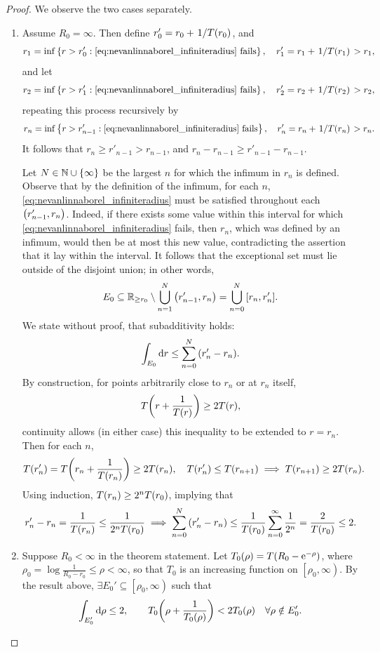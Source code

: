 \begin{proof}
    We observe the two cases separately.
    \begin{enumerate}
        \item Assume \(R_0=\infty\). Then define \(r'_0=r_0+\flatfrac1{T\qty(r_0)}\), and \[r_1=\inf\cbraces{r>r'_0}{\text{\cref{eq:nevanlinnaborel_infiniteradius} fails}},\quad r'_1=r_1+\flatfrac1{T\qty(r_1)}>r_1,\]
            and let \[r_2=\inf\cbraces{r>r'_1}{\text{\cref{eq:nevanlinnaborel_infiniteradius} fails}},\quad r'_2=r_2+\flatfrac1{T\qty(r_2)}>r_2,\] repeating this process recursively by \[r_n=\inf\cbraces{r>r'_{n-1}}{\text{\cref{eq:nevanlinnaborel_infiniteradius} fails}},\quad r'_n=r_n+\flatfrac1{T\qty(r_n)}>r_n.\] It follows that \(r_n\geq r'_{n-1}>r_{n-1}\), and \(r_n-r_{n-1}\geq r'_{n-1}-r_{n-1}\).

            Let \(N\in\mathbb{N}\cup\qty{\infty}\) be the largest \(n\) for which the infimum in \(r_n\) is defined. Observe that by the definition of the infimum, for each \(n\), \cref{eq:nevanlinnaborel_infiniteradius} must be satisfied throughout each \(\qty(r'_{n-1},r_n)\). Indeed, if there exists some value within this interval for which \cref{eq:nevanlinnaborel_infiniteradius} fails, then \(r_n\), which was defined by an infimum, would then be at most this new value, contradicting the assertion that it lay within the interval. It follows that the exceptional set must lie outside of the disjoint union; in other words, \[E_0\subseteq\mathbb{R}_{\geq r_0}\setminus\bigcup_{n=1}^N\qty(r'_{n-1},r_n)=\bigcup_{n=0}^N\qty[r_n,r'_n].\]
            We state without proof, that subadditivity holds:
            \[\int_{E_0}\dd{r}\leq\sum_{n=0}^N\qty(r'_n-r_n).\]
            By construction, for points arbitrarily close to \(r_n\) or at \(r_n\) itself, \[T\qty(r+\frac1{T(r)})\geq 2T(r),\]
            continuity allows (in either case) this inequality to be extended to \(r=r_n\). Then for each \(n\), \[T\qty(r'_n)=T\qty(r_n+\frac1{T\qty(r_n)})\geq 2T\qty(r_n),\quad T\qty(r'_n)\leq T\qty(r_{n+1})\implies T\qty(r_{n+1})\geq 2T\qty(r_n).\]
            Using induction, \(T(r_n)\geq 2^nT\qty(r_0)\), implying that \[r'_n-r_n=\frac1{T(r_n)}\leq\frac1{2^nT\qty(r_0)}\implies\sum_{n=0}^N\qty(r'_n-r_n)\leq\frac1{T(r_0)}\sum_{n=0}^\infty\frac1{2^n}=\frac2{T\qty(r_0)}\leq2.\]
        \item Suppose \(R_0<\infty\) in the theorem statement. Let \(T_0(\rho)=T\qty(R_0-\mathrm{e}^{-\rho})\), where \(\rho_0=\log\tfrac1{R_0-r_0}\leq\rho<\infty\), so that \(T_0\) is an increasing function on \(\left[\rho_0,\infty\right)\). By the result above, \(\exists E_0'\subseteq\left[\rho_0,\infty\right)\) such that \[\int_{E_0'}\dd{\rho}\leq 2,\qquad T_0\qty(\rho+\frac1{T_0(\rho)})<2T_0(\rho)\quad\forall \rho\notin E'_0.\]

\end{enumerate}
\end{proof}
